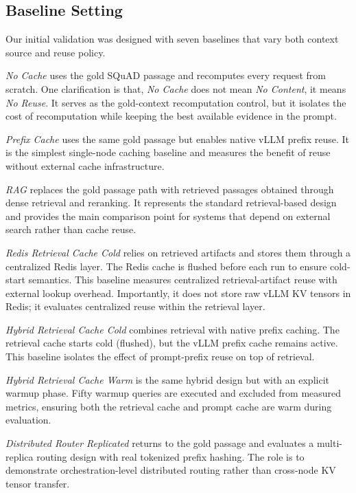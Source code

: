 \documentclass[12pt,a4paper]{article}
\begin{document}
\subsection{Baseline Setting}

Our initial validation was designed with seven baselines that vary both context source and reuse policy.

\textit{No Cache} uses the gold SQuAD passage and recomputes every request from scratch. One clarification is that, \textit{No Cache} does not mean \textit{No Content}, it means \textit{No Reuse}. It serves as the gold-context recomputation control, but it isolates the cost of recomputation while keeping the best available evidence in the prompt.

\textit{Prefix Cache} uses the same gold passage but enables native vLLM prefix reuse. It is the simplest single-node caching baseline and measures the benefit of reuse without external cache infrastructure. 

\textit{RAG} replaces the gold passage path with retrieved passages obtained through dense retrieval and reranking. It represents the standard retrieval-based design and provides the main comparison point for systems that depend on external search rather than cache reuse.

\textit{Redis Retrieval Cache Cold} relies on retrieved artifacts and stores them through a centralized Redis layer. The Redis cache is flushed before each run to ensure cold-start semantics. This baseline measures centralized retrieval-artifact reuse with external lookup overhead. Importantly, it does not store raw vLLM KV tensors in Redis; it evaluates centralized reuse within the retrieval layer.

\textit{Hybrid Retrieval Cache Cold} combines retrieval with native prefix caching. The retrieval cache starts cold (flushed), but the vLLM prefix cache remains active. This baseline isolates the effect of prompt-prefix reuse on top of retrieval.

\textit{Hybrid Retrieval Cache Warm} is the same hybrid design but with an explicit warmup phase. Fifty warmup queries are executed and excluded from measured metrics, ensuring both the retrieval cache and prompt cache are warm during evaluation.

\textit{Distributed Router Replicated}  returns to the gold passage and evaluates a multi-replica routing design with real tokenized prefix hashing. The role is to demonstrate orchestration-level distributed routing rather than cross-node KV tensor transfer.
\end{document}
